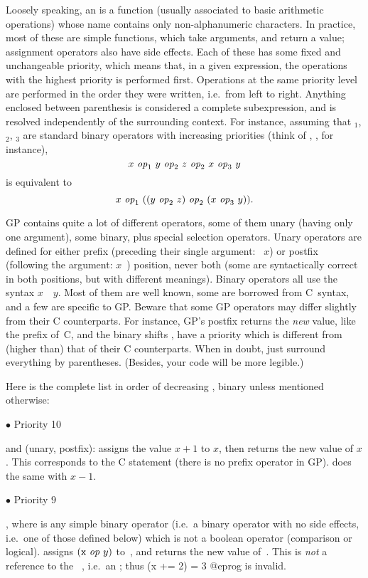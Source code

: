 \noindent Loosely speaking, an  is a function (usually
associated to basic arithmetic operations) whose name contains only
non-alphanumeric characters. In practice, most of these are simple functions,
which take arguments, and return a value; assignment operators also have side
effects. Each of these has some fixed and unchangeable priority, which means
that, in a given expression, the operations with the highest priority is
performed first. Operations at the same priority level are performed in the
order they were written, i.e.~from left to right. Anything enclosed between
parenthesis is considered a complete subexpression, and is resolved
independently of the surrounding context. For instance, assuming that
$_1$, $_2$, $_3$ are standard binary operators with
increasing priorities (think of \kbd{+}, \kbd{*}, \kbd{\pow} for instance),
$$ x~\hbox{\it op\/}_1~y~\hbox{\it op\/}_2~z~\hbox{\it op\/}_2~x~\hbox{\it op\/}_3~y $$ is
equivalent to $$ x~\hbox{\it op\/}_1~((y~\hbox{\it op\/}_2~z)~\hbox{\it op\/}_2~
(x~\hbox{\it op\/}_3~y)).$$

GP contains quite a lot of different operators, some of them unary (having only
one argument), some binary, plus special selection operators. Unary operators
are defined for either prefix (preceding their single argument: ~$x$)
or postfix (following the argument: $x$~) position, never both (some
are syntactically correct in both positions, but with different meanings).
Binary operators all use the syntax $x$~~$y$. Most of them are well
known, some are borrowed from C~syntax, and a few are specific to GP. Beware
that some GP operators may differ slightly from their C counterparts. For
instance, GP's postfix \kbd{++} returns the \emph{new} value, like the prefix
\kbd{++} of~C, and the binary shifts \kbd{<<}, \kbd{>>} have a priority which
is different from (higher than) that of their C counterparts. When in doubt,
just surround everything by parentheses. (Besides, your code will be
more legible.)

\noindent Here is the complete list in order of decreasing ,
binary unless mentioned otherwise:

\def\point#1{\noindent $\bullet$ #1\hfill\break\indent\strut} \point{Priority
10}
%
\kbd{++} and \kbd{--} (unary, postfix):  assigns the value $x+1$
to $x$, then returns the new value of $x$. This corresponds to the C
statement  (there is no prefix \kbd{++} operator in GP).
 does the same with $x-1$.

\point{Priority 9}
%
, where  is any simple binary operator (i.e.~a binary
operator with no side effects, i.e.~one of those defined below) which is not
a boolean operator (comparison or logical).  assigns
$({\tt x}~\hbox{\it op\/}~y)$ to~, and returns the new value of~.
This is \emph{not} a reference to the ~, i.e.~an
; thus
\bprog
  (x += 2) = 3
@eprog\noindent
is invalid.

